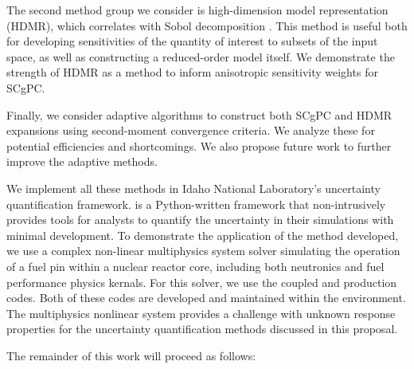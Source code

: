 The second method group we consider is high-dimension model representation (HDMR), which correlates with Sobol
decomposition \cite{hdmr}.  This method is useful both for developing sensitivities of the quantity of interest to subsets
of the input space, as well as constructing a reduced-order model itself.  We demonstrate the strength of HDMR
as a method to inform anisotropic sensitivity weights for SCgPC.

Finally, we consider adaptive algorithms to construct both SCgPC and HDMR expansions using second-moment
convergence criteria.  We analyze these for potential efficiencies and shortcomings.  We also propose future
work to further improve the adaptive methods.

We implement all these methods in Idaho National Laboratory's \raven{}\cite{raven}
uncertainty quantification framework. \raven{} is a Python-written framework that non-intrusively provides
tools for analysts to quantify the uncertainty in their simulations with minimal development.  To demonstrate
the application of the method developed, we use a complex non-linear multiphysics system solver simulating
the operation of a fuel pin within a nuclear reactor core, including both neutronics and fuel performance
physics kernals.  For this solver, we use the coupled \rattlesnake{}\cite{rattlesnake} and 
\bison{} \cite{bison,mammoth} production codes.
Both of these codes are developed and maintained within the \moose{}\cite{moose} environment.  The
multiphysics nonlinear system provides a challenge with unknown response properties for the uncertainty
quantification methods discussed in this proposal.

The remainder of this work will proceed as follows:

